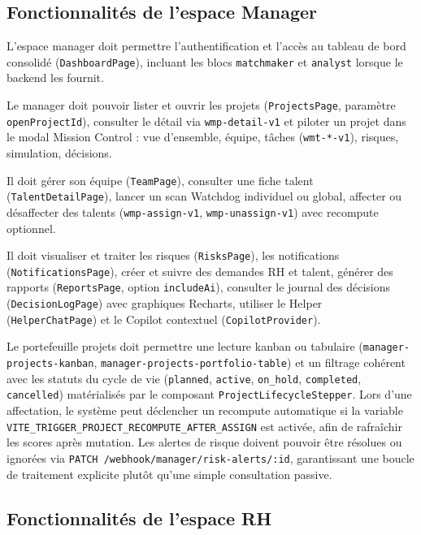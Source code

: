 \subsection{Fonctionnalités de l'espace Manager}

L'espace manager doit permettre l'authentification et l'accès au tableau de bord consolidé (\texttt{DashboardPage}), incluant les blocs \texttt{matchmaker} et \texttt{analyst} lorsque le backend les fournit.

Le manager doit pouvoir lister et ouvrir les projets (\texttt{ProjectsPage}, paramètre \texttt{openProjectId}), consulter le détail via \texttt{wmp-detail-v1} et piloter un projet dans le modal Mission Control : vue d'ensemble, équipe, tâches (\texttt{wmt-*-v1}), risques, simulation, décisions.

Il doit gérer son équipe (\texttt{TeamPage}), consulter une fiche talent (\texttt{TalentDetailPage}), lancer un scan Watchdog individuel ou global, affecter ou désaffecter des talents (\texttt{wmp-assign-v1}, \texttt{wmp-unassign-v1}) avec recompute optionnel.

Il doit visualiser et traiter les risques (\texttt{RisksPage}), les notifications (\texttt{NotificationsPage}), créer et suivre des demandes RH et talent, générer des rapports (\texttt{ReportsPage}, option \texttt{includeAi}), consulter le journal des décisions (\texttt{DecisionLogPage}) avec graphiques Recharts, utiliser le Helper (\texttt{HelperChatPage}) et le Copilot contextuel (\texttt{CopilotProvider}).

Le portefeuille projets doit permettre une lecture kanban ou tabulaire (\texttt{manager-projects-kanban}, \texttt{manager-projects-portfolio-table}) et un filtrage cohérent avec les statuts du cycle de vie (\texttt{planned}, \texttt{active}, \texttt{on\_hold}, \texttt{completed}, \texttt{cancelled}) matérialisés par le composant \texttt{ProjectLifecycleStepper}. Lors d'une affectation, le système peut déclencher un recompute automatique si la variable \texttt{VITE\_TRIGGER\_PROJECT\_RECOMPUTE\_AFTER\_ASSIGN} est activée, afin de rafraîchir les scores après mutation. Les alertes de risque doivent pouvoir être résolues ou ignorées via \texttt{PATCH /webhook/manager/risk-alerts/:id}, garantissant une boucle de traitement explicite plutôt qu'une simple consultation passive.

\subsection{Fonctionnalités de l'espace RH}

